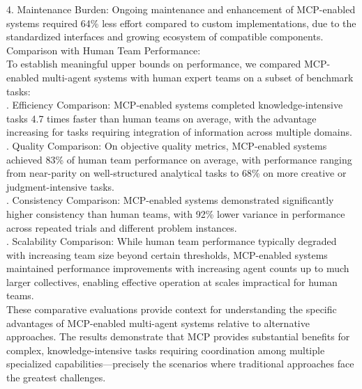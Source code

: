 4. Maintenance Burden: Ongoing maintenance and enhancement of MCP-enabled systems required 64\% less effort compared to custom implementations, due to the standardized interfaces and growing ecosystem of compatible components.\\ \newline
Comparison with Human Team Performance:\\ \newline
To establish meaningful upper bounds on performance, we compared MCP-enabled multi-agent systems with human expert teams on a subset of benchmark tasks:\\ . Efficiency Comparison: MCP-enabled systems completed knowledge-intensive tasks 4.7 times faster than human teams on average, with the advantage increasing for tasks requiring integration of information across multiple domains.\\ . Quality Comparison: On objective quality metrics, MCP-enabled systems achieved 83\% of human team performance on average, with performance ranging from near-parity on well-structured analytical tasks to 68\% on more creative or judgment-intensive tasks.\\ . Consistency Comparison: MCP-enabled systems demonstrated significantly higher consistency than human teams, with 92\% lower variance in performance across repeated trials and different problem instances.\\ . Scalability Comparison: While human team performance typically degraded with increasing team size beyond certain thresholds, MCP-enabled systems maintained performance improvements with increasing agent counts up to much larger collectives, enabling effective operation at scales impractical for human teams.\\ \newline
These comparative evaluations provide context for understanding the specific advantages of MCP-enabled multi-agent systems relative to alternative approaches. The results demonstrate that MCP provides substantial benefits for complex, knowledge-intensive tasks requiring coordination among multiple specialized capabilities—precisely the scenarios where traditional approaches face the greatest challenges.\\
